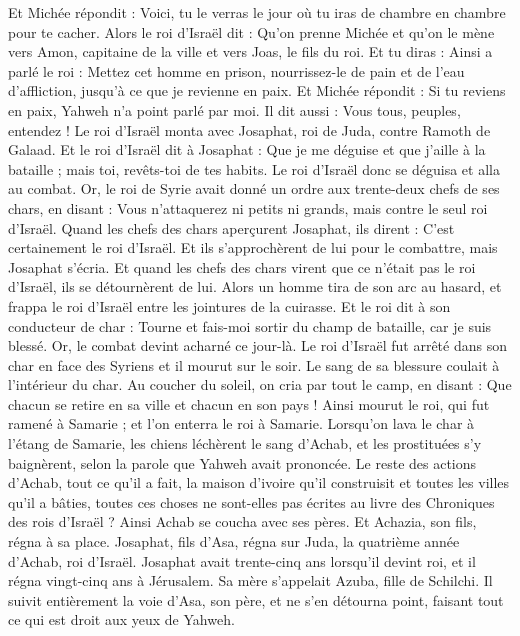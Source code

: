 \begin{multicols}{2}
Et Michée répondit : Voici, tu le verras le jour où tu iras de chambre en chambre pour te cacher.
Alors le roi d'Israël dit : Qu'on prenne Michée et qu'on le mène vers Amon, capitaine de la ville et vers Joas, le fils du roi.
Et tu diras : Ainsi a parlé le roi : Mettez cet homme en prison, nourrissez-le de pain et de l’eau d’affliction, jusqu'à ce que je revienne en paix.
Et Michée répondit : Si tu reviens en paix, Yahweh n'a point parlé par moi. Il dit aussi : Vous tous, peuples, entendez !
Le roi d'Israël monta avec Josaphat, roi de Juda, contre Ramoth de Galaad.
Et le roi d'Israël dit à Josaphat : Que je me déguise et que j'aille à la bataille ; mais toi, revêts-toi de tes habits. Le roi d'Israël donc se déguisa et alla au combat.
Or, le roi de Syrie avait donné un ordre aux trente-deux chefs de ses chars, en disant : Vous n’attaquerez ni petits ni grands, mais contre le seul roi d'Israël.
Quand les chefs des chars aperçurent Josaphat, ils dirent : C'est certainement le roi d'Israël. Et ils s’approchèrent de lui pour le combattre, mais Josaphat s'écria.
Et quand les chefs des chars virent que ce n'était pas le roi d'Israël, ils se détournèrent de lui.
Alors un homme tira de son arc au hasard, et frappa le roi d'Israël entre les jointures de la cuirasse. Et le roi dit à son conducteur de char : Tourne et fais-moi sortir du champ de bataille, car je suis blessé.
Or, le combat devint acharné ce jour-là. Le roi d'Israël fut arrêté dans son char en face des Syriens et il mourut sur le soir. Le sang de sa blessure coulait à l’intérieur du char.
Au coucher du soleil, on cria par tout le camp, en disant : Que chacun se retire en sa ville et chacun en son pays !
Ainsi mourut le roi, qui fut ramené à Samarie ; et l’on enterra le roi à Samarie.
Lorsqu’on lava le char à l’étang de Samarie, les chiens léchèrent le sang d’Achab, et les prostituées s’y baignèrent, selon la parole que Yahweh avait prononcée.
Le reste des actions d'Achab, tout ce qu’il a fait, la maison d'ivoire qu'il construisit et toutes les villes qu'il a bâties, toutes ces choses ne sont-elles pas écrites au livre des Chroniques des rois d'Israël ?
Ainsi Achab se coucha avec ses pères. Et Achazia, son fils, régna à sa place.
Josaphat, fils d'Asa, régna sur Juda, la quatrième année d'Achab, roi d'Israël.
Josaphat avait trente-cinq ans lorsqu’il devint roi, et il régna vingt-cinq ans à Jérusalem. Sa mère s’appelait Azuba, fille de Schilchi.
Il suivit entièrement la voie d'Asa, son père, et ne s'en détourna point, faisant tout ce qui est droit aux yeux de Yahweh.

\end{multicols}
